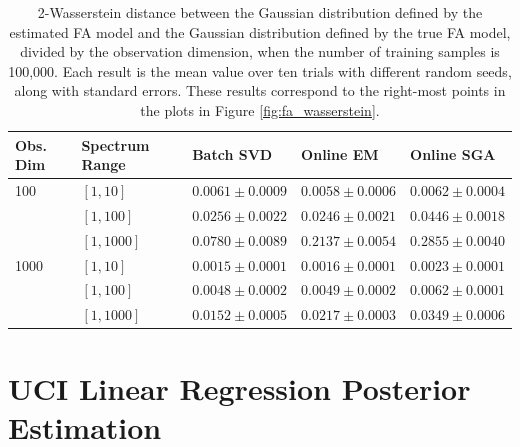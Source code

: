 \documentclass[msc,deptreport.inf]{infthesis} %
\begin{document}
\begin{table}[h!]
	\begin{center}
		\begin{tabular}{@{} lllll @{}} 
 			\toprule
 			Obs. Dim & Spectrum Range & Batch SVD & Online EM & Online SGA \\ 
 			\midrule
			100 	& $[1, 10]$ 	& $\mathbf{0.0061 \pm 0.0009}$ & $\mathbf{0.0058 \pm 0.0006}$ 	& $\mathbf{0.0062 \pm 0.0004}$ \\ 
				& $[1, 100]$ 	& $\mathbf{0.0256 \pm 0.0022}$ & $\mathbf{0.0246 \pm 0.0021}$ 	& $0.0446 \pm 0.0018$ \\ 
				& $[1, 1000]$	& $\mathbf{0.0780 \pm 0.0089}$ & $0.2137 \pm 0.0054$ 			& $0.2855 \pm 0.0040$ \\ 
			\midrule
			1000	& $[1, 10]$ 	& $\mathbf{0.0015 \pm 0.0001}$ & $\mathbf{0.0016 \pm 0.0001}$ 	& $0.0023 \pm 0.0001$ \\ 
				& $[1, 100]$ 	& $\mathbf{0.0048 \pm 0.0002}$ & $\mathbf{0.0049 \pm 0.0002}$ 	& $0.0062 \pm 0.0001$ \\ 
				& $[1, 1000]$ 	& $\mathbf{0.0152 \pm 0.0005}$ & $0.0217 \pm 0.0003$ 			& $0.0349 \pm 0.0006$ \\ 
			\bottomrule
		\end{tabular}
		\caption{2-Wasserstein distance between the Gaussian distribution defined by the estimated FA model and the Gaussian distribution defined by the true FA model, divided by the observation dimension, when the number of training samples is 100,000. Each result is the mean value over ten trials with different random seeds, along with standard errors. These results correspond to the right-most points in the plots in Figure \ref{fig:fa_wasserstein}.}
		\label{table:fa_wasserstein}
	\end{center}
\end{table}

\section{UCI Linear Regression Posterior Estimation}\label{app:uci_posterior}
\end{document}
